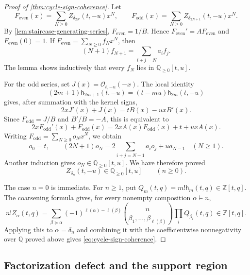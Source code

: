 \documentclass{amsart}
\theoremstyle{definition}
\theoremstyle{remark}
\begin{document}
\begin{proof}[Proof of \cref{thm:cycle-sign-coherence}]
Let
\[
 F_{\mathrm{even}}(x)=\sum_{N\geq0}Z_{\delta_{2N}}(t,-u)x^N,
 \qquad
 F_{\mathrm{odd}}(x)=\sum_{N\geq0}Z_{\delta_{2N+1}}(t,-u)x^N.
\]
By \cref{lem:staircase-generating-series}, \(F_{\mathrm{even}}=1/B\).
Hence \(F_{\mathrm{even}}'=AF_{\mathrm{even}}\) and
\(F_{\mathrm{even}}(0)=1\).  If
\(F_{\mathrm{even}}=\sum_{N\geq0}f_Nx^N\), then
\[
 (N+1)f_{N+1}=\sum_{i+j=N}a_i f_j.
\]
The lemma shows inductively that every \(f_N\) lies in
\(\mathbb Q_{\geq0}[t,u]\).

For the odd series, set \(J(x)=\mathcal O_{t,-u}(-x)\).  The local identity
\begin{equation*}
 (2m+1)\mathsf h_{2m+1}(t,-u)
 =(t-mu)\mathsf h_{2m}(t,-u)
\end{equation*}
gives, after summation with the kernel signs,
\[
 2xJ'(x)+J(x)=tB(x)-uxB'(x).
\]
Since \(F_{\mathrm{odd}}=J/B\) and \(B'/B=-A\), this is equivalent to
\begin{equation*}
 2xF_{\mathrm{odd}}'(x)+F_{\mathrm{odd}}(x)
 =2xA(x)F_{\mathrm{odd}}(x)+t+uxA(x).
\end{equation*}
Writing \(F_{\mathrm{odd}}=\sum_{N\geq0}o_Nx^N\), we obtain
\[
 o_0=t,\qquad
 (2N+1)o_N
 =2\sum_{i+j=N-1}a_i o_j+ua_{N-1}\quad(N\geq1).
\]
Another induction gives \(o_N\in\mathbb Q_{\geq0}[t,u]\).  We have therefore
proved
\[
 Z_{\delta_n}(t,-u)\in\mathbb Q_{\geq0}[t,u]\qquad(n\geq0).
\]

The case $n=0$ is immediate.  For $n\geq1$, put
\(Q_m(t,q)=m!\mathsf h_m(t,q)\in\mathbb Z[t,q]\).  The coarsening formula
gives, for every nonempty composition \(\alpha\models n\),
\[
 n!Z_\alpha(t,q)
 =\sum_{\beta\succeq\alpha}
 (-1)^{\ell(\alpha)-\ell(\beta)}
 \binom{n}{\beta_1,\ldots,\beta_{\ell(\beta)}}
 \prod_i Q_{\beta_i}(t,q)
 \in\mathbb Z[t,q].
\]
Applying this to $\alpha=\delta_n$ and combining it with the coefficientwise
nonnegativity over $\mathbb Q$ proved above gives
\eqref{eq:cycle-sign-coherence}.
\end{proof}


\subsection{Factorization defect and the support region}
\end{document}
